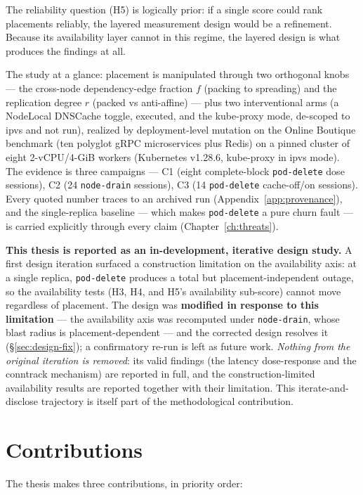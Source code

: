 The reliability question (H5) is logically prior: if a single score could rank
placements reliably, the layered measurement design would be a refinement.
Because its availability layer cannot in this regime, the layered design is what
produces the findings at all.

The study at a glance: placement is manipulated through two orthogonal knobs ---
the cross-node dependency-edge fraction $f$ (packing to spreading) and the
replication degree $r$ (packed vs anti-affine) --- plus two interventional arms
(a NodeLocal DNSCache toggle, executed, and the kube-proxy mode, de-scoped to
ipvs and not run), realized by
deployment-level mutation on the Online Boutique benchmark (ten polyglot gRPC
microservices plus Redis) on a pinned cluster of eight 2-vCPU/4-GiB workers
(Kubernetes v1.28.6, kube-proxy in ipvs mode). The evidence is three
campaigns --- C1 (eight complete-block \texttt{pod-delete} dose
sessions), C2 (24 \texttt{node-drain} sessions), C3 (14 \texttt{pod-delete}
cache-off/on sessions). Every quoted number traces to an archived run
(Appendix~\ref{app:provenance}), and the single-replica baseline --- which makes
\texttt{pod-delete} a pure churn fault --- is carried explicitly through every
claim (Chapter~\ref{ch:threats}).

\textbf{This thesis is reported as an in-development, iterative design study.} A
first design iteration surfaced a construction limitation on the availability
axis: at a single replica, \texttt{pod-delete} produces a total but
placement-independent outage, so the availability tests (H3, H4, and H5's
availability sub-score) cannot move regardless of placement. The design was
\textbf{modified in response to this limitation} --- the availability axis was
recomputed under \texttt{node-drain}, whose blast radius is placement-dependent
--- and the corrected design resolves it (\S\ref{sec:design-fix}); a
confirmatory re-run is left as future work. \emph{Nothing from the original
iteration is removed}: its valid findings (the latency dose-response and the
conntrack mechanism) are reported in full, and the construction-limited
availability results are reported together with their limitation. This
iterate-and-disclose trajectory is itself part of the methodological
contribution.

\section{Contributions}\label{sec:contributions}

The thesis makes three contributions, in priority order:

